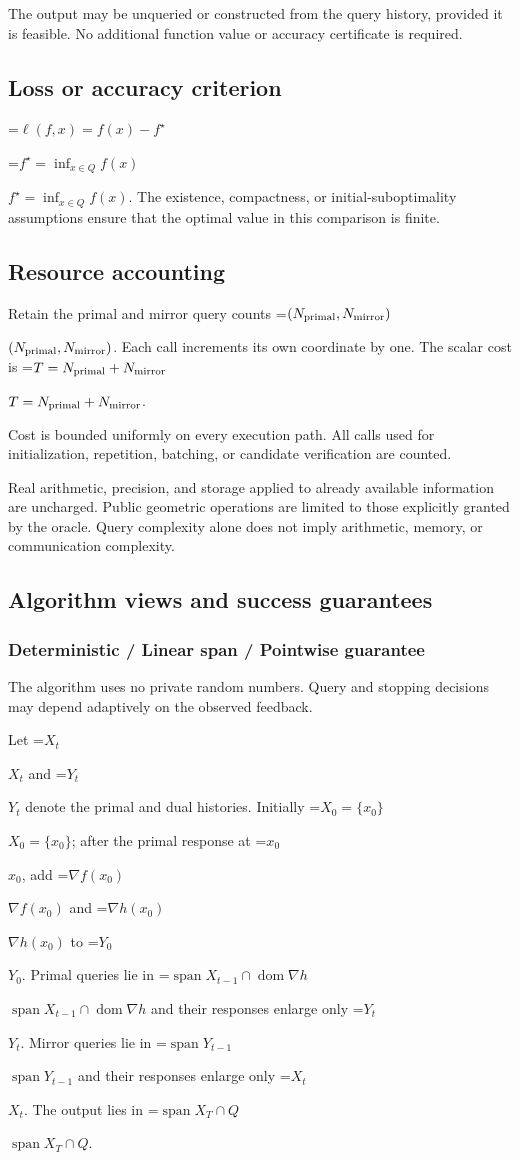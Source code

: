 \documentclass[10pt,a4paper]{article}
\newcommand{\AtlasMath}[1]{\par\begingroup\centering\setbox0=\hbox{$\displaystyle #1$}\ifdim\wd0>1.4\linewidth\typeout{ATLAS WIDE FORMULA: \the\wd0}\fi\ifdim\wd0>\linewidth\resizebox{\linewidth}{!}{\box0}\else\box0\fi\par\endgroup}
\newcommand{\AtlasInlineMath}[1]{\begingroup\setbox0=\hbox{$#1$}\ifdim\wd0>.4\linewidth\endgroup\AtlasMath{#1}\else\endgroup$#1$\fi}
\begin{document}
The output may be unqueried or constructed from the query history, provided it is feasible. No additional function value or accuracy certificate is required.

\subsection{Loss or accuracy criterion}

\AtlasMath{\ell(f,x)=f(x)-f^\star}


\AtlasInlineMath{f^\star=\inf_{x\in Q}f(x)}. The existence, compactness, or initial-suboptimality assumptions ensure that the optimal value in this comparison is finite.

\subsection{Resource accounting}
Retain the primal and mirror query counts \AtlasInlineMath{(N_{\rm primal},N_{\rm mirror})}. Each call increments its own coordinate by one. The scalar cost is \AtlasInlineMath{T=N_{\rm primal}+N_{\rm mirror}}.

Cost is bounded uniformly on every execution path. All calls used for initialization, repetition, batching, or candidate verification are counted.

Real arithmetic, precision, and storage applied to already available information are uncharged. Public geometric operations are limited to those explicitly granted by the oracle. Query complexity alone does not imply arithmetic, memory, or communication complexity.

\subsection{Algorithm views and success guarantees}
\subsubsection{Deterministic / Linear span / Pointwise guarantee}
The algorithm uses no private random numbers. Query and stopping decisions may depend adaptively on the observed feedback.

Let \AtlasInlineMath{X_t} and \AtlasInlineMath{Y_t} denote the primal and dual histories. Initially \AtlasInlineMath{X_0=\{x_0\}}; after the primal response at \AtlasInlineMath{x_0}, add \AtlasInlineMath{\nabla f(x_0)} and \AtlasInlineMath{\nabla h(x_0)} to \AtlasInlineMath{Y_0}. Primal queries lie in \AtlasInlineMath{\operatorname{span}X_{t-1}\cap\operatorname{dom}\nabla h} and their responses enlarge only \AtlasInlineMath{Y_t}. Mirror queries lie in \AtlasInlineMath{\operatorname{span}Y_{t-1}} and their responses enlarge only \AtlasInlineMath{X_t}. The output lies in \AtlasInlineMath{\operatorname{span}X_T\cap Q}.
\end{document}
